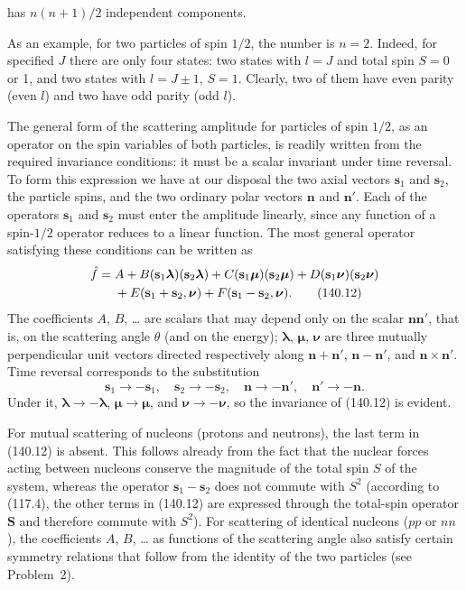 has $n(n+1)/2$ independent components.

As an example, for two particles of spin $1/2$, the number is $n=2$. Indeed, for specified $J$ there are only four states: two states with $l=J$ and total spin $S=0$ or 1, and two states with $l=J\pm1$, $S=1$. Clearly, two of them have even parity (even $l$) and two have odd parity (odd $l$).

The general form of the scattering amplitude for particles of spin $1/2$, as an operator on the spin variables of both particles, is readily written from the required invariance conditions: it must be a scalar invariant under time reversal. To form this expression we have at our disposal the two axial vectors $\mathbf s_1$ and $\mathbf s_2$, the particle spins, and the two ordinary polar vectors $\mathbf n$ and $\mathbf n'$. Each of the operators $\mathbf s_1$ and $\mathbf s_2$ must enter the amplitude linearly, since any function of a spin-$1/2$ operator reduces to a linear function. The most general operator satisfying these conditions can be written as
\begin{align}
 \hat f={}&A+B(\mathbf s_1\boldsymbol\lambda)(\mathbf s_2\boldsymbol\lambda)+C(\mathbf s_1\boldsymbol\mu)(\mathbf s_2\boldsymbol\mu)+D(\mathbf s_1\boldsymbol\nu)(\mathbf s_2\boldsymbol\nu)\notag\\
 &+E(\mathbf s_1+\mathbf s_2,\boldsymbol\nu)+F(\mathbf s_1-\mathbf s_2,\boldsymbol\nu).
 \tag{140.12}
\end{align}
The coefficients $A$, $B$, \ldots{} are scalars that may depend only on the scalar $\mathbf n\mathbf n'$, that is, on the scattering angle $\theta$ (and on the energy); $\boldsymbol\lambda$, $\boldsymbol\mu$, $\boldsymbol\nu$ are three mutually perpendicular unit vectors directed respectively along $\mathbf n+\mathbf n'$, $\mathbf n-\mathbf n'$, and $\mathbf n\times\mathbf n'$. Time reversal corresponds to the substitution
\[
 \mathbf s_1\to-\mathbf s_1,\quad\mathbf s_2\to-\mathbf s_2,\quad
 \mathbf n\to-\mathbf n',\quad\mathbf n'\to-\mathbf n.
\]
Under it, $\boldsymbol\lambda\to-\boldsymbol\lambda$, $\boldsymbol\mu\to\boldsymbol\mu$, and $\boldsymbol\nu\to-\boldsymbol\nu$, so the invariance of (140.12) is evident.

For mutual scattering of nucleons (protons and neutrons), the last term in (140.12) is absent. This follows already from the fact that the nuclear forces acting between nucleons conserve the magnitude of the total spin $S$ of the system, whereas the operator $\mathbf s_1-\mathbf s_2$ does not commute with $S^2$ (according to (117.4), the other terms in (140.12) are expressed through the total-spin operator $\mathbf S$ and therefore commute with $S^2$). For scattering of identical nucleons ($pp$ or $nn$), the coefficients $A$, $B$, \ldots{} as functions of the scattering angle also satisfy certain symmetry relations that follow from the identity of the two particles (see Problem~2).


